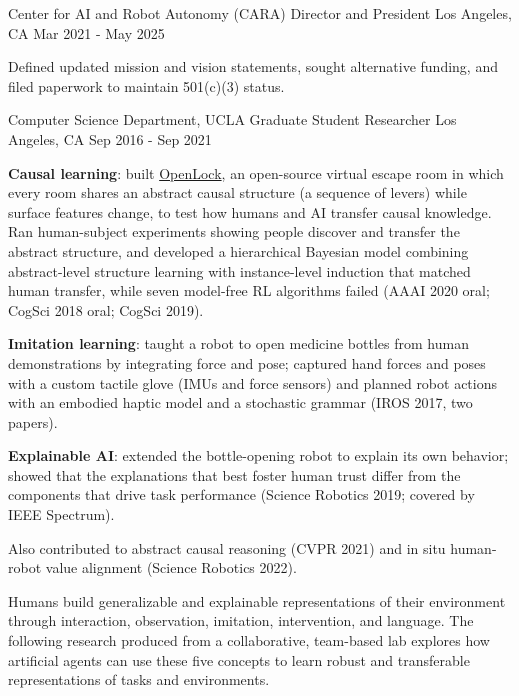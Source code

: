 \begin{cventries}
\ifresume\else
\cventry
{Center for AI and Robot Autonomy (CARA)}
{Director and President}
{Los Angeles, CA}
{Mar 2021 - May 2025}
{
\begin{cvitems}
\item Defined updated mission and vision statements, sought alternative funding, and filed paperwork to maintain 501(c)(3) status.
\end{cvitems}
}
\fi

\cventry
{Computer Science Department, UCLA}
{Graduate Student Researcher}
{Los Angeles, CA}
{Sep 2016 - Sep 2021}
{
\ifresume
\begin{cvitems}
  \item \textbf{Causal learning}: built \href{https://github.com/mjedmonds/OpenLock}{OpenLock}, an open-source virtual escape room in which every room shares an abstract causal structure (a sequence of levers) while surface features change, to test how humans and AI transfer causal knowledge. Ran human-subject experiments showing people discover and transfer the abstract structure, and developed a hierarchical Bayesian model combining abstract-level structure learning with instance-level induction that matched human transfer, while seven model-free RL algorithms failed (AAAI 2020 oral; CogSci 2018 oral; CogSci 2019).
  \item \textbf{Imitation learning}: taught a robot to open medicine bottles from human demonstrations by integrating force and pose; captured hand forces and poses with a custom tactile glove (IMUs and force sensors) and planned robot actions with an embodied haptic model and a stochastic grammar (IROS 2017, two papers).
  \item \textbf{Explainable AI}: extended the bottle-opening robot to explain its own behavior; showed that the explanations that best foster human trust differ from the components that drive task performance (Science Robotics 2019; covered by IEEE Spectrum).
  \item Also contributed to abstract causal reasoning (CVPR 2021) and in situ human-robot value alignment (Science Robotics 2022).
\end{cvitems}
\else
\begin{justify}
Humans build generalizable and explainable representations of their environment through interaction, observation, imitation, intervention, and language. The following research produced from a collaborative, team-based lab explores how artificial agents can use these five concepts to learn robust and transferable representations of tasks and environments.

\end{justify}}
\end{cventries}
